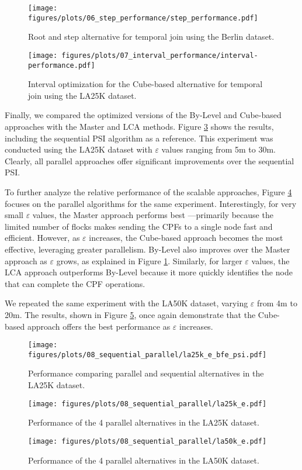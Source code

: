 \begin{figure}
    \centering
    \texttt{[image: figures/plots/06\_step\_performance/step\_performance.pdf]}
    \caption{Root and step alternative for temporal join using the Berlin dataset.}\label{fig:step_performance}
\end{figure}

\begin{figure}
    \centering
    \texttt{[image: figures/plots/07\_interval\_performance/interval-performance.pdf]}
    \caption{Interval optimization for the Cube-based alternative for temporal join using the LA25K dataset.}\label{fig:interval_performance}
\end{figure}

Finally, we compared the optimized versions of the By-Level and Cube-based approaches with the Master and LCA methods. Figure \ref{fig:la25k_e_bfe_psi} shows the results, including the sequential PSI algorithm as a reference. This experiment was conducted using the LA25K dataset with $\varepsilon$ values ranging from 5m to 30m. Clearly, all parallel approaches offer significant improvements over the sequential PSI.

To further analyze the relative performance of the scalable approaches, Figure \ref{fig:la25k_e} focuses on the parallel algorithms for the same experiment. Interestingly, for very small $\varepsilon$ values, the Master approach performs best —primarily because the limited number of flocks makes sending the CPFs to a single node fast and efficient. However, as $\varepsilon$ increases, the Cube-based approach becomes the most effective, leveraging greater parallelism. By-Level also improves over the Master approach as $\varepsilon$ grows, as explained in Figure \ref{fig:step_performance}. Similarly, for larger $\varepsilon$ values, the LCA approach outperforms By-Level because it more quickly identifies the node that can complete the CPF operations.

We repeated the same experiment with the LA50K dataset, varying $\varepsilon$ from 4m to 20m. The results, shown in Figure \ref{fig:la50k_e}, once again demonstrate that the Cube-based approach offers the best performance as $\varepsilon$ increases.

\begin{figure}
    \centering
    \texttt{[image: figures/plots/08\_sequential\_parallel/la25k\_e\_bfe\_psi.pdf]}
    \caption{Performance comparing parallel and sequential alternatives in the LA25K dataset.}\label{fig:la25k_e_bfe_psi}
\end{figure}

\begin{figure}
    \centering
    \texttt{[image: figures/plots/08\_sequential\_parallel/la25k\_e.pdf]}
    \caption{Performance of the 4 parallel alternatives in the LA25K dataset.}\label{fig:la25k_e}
\end{figure}

\begin{figure}
    \centering
    \texttt{[image: figures/plots/08\_sequential\_parallel/la50k\_e.pdf]}
    \caption{Performance of the 4 parallel alternatives in the LA50K dataset.}\label{fig:la50k_e}
\end{figure}
